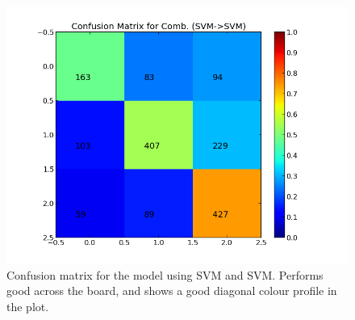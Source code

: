 \begin{minipage}[s]{\linewidth}
\begin{minipage}{0.45\linewidth}
\begin{figure}[H]
                \includegraphics[width=\linewidth]{../img/plots/grid/confusion_matrix_Comb-SVM-SVM.png}
            \caption[Plot showing the confusion matrix for two-step SVM -> SVM]{Confusion matrix for the model using SVM and SVM. Performs good across the board, and shows a good diagonal colour profile in the plot.}
            \label{fig:confmat_svm_svm}
           \end{figure}
      \end{minipage}
\end{minipage}


